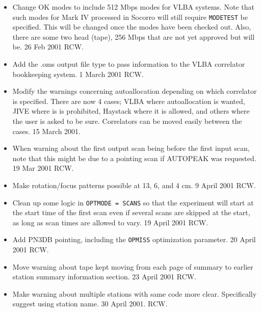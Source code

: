 \documentclass{report}
\begin{document}
\begin{itemize}


\item  Change OK modes to include 512 Mbps modes for VLBA systems.
       Note that such modes for Mark IV processed in Socorro will
       still require {\tt MODETEST} be specified.  This will be
       changed once the modes have been checked out.  Also, there
       are some two head (tape), 256 Mbps that are not yet approved
       but will be.  26 Feb 2001 RCW.

\item  Add the .oms output file type to pass information to the
       VLBA correlator bookkeeping system.   1 March 2001 RCW.

\item  Modify the warnings concerning autoallocation depending
       on which correlator is specified.  There are now 4 cases;
       VLBA where autoallocation is wanted, JIVE where is is
       prohibited, Haystack where it is allowed, and others where
       the user is asked to be sure.  Correlators can be moved
       easily between the cases.
       15 March 2001.

\item  When warning about the first output scan being before the
       first input scan, note that this might be due to a pointing
       scan if AUTOPEAK was requested.  19 Mar 2001  RCW.

\item  Make rotation/focus patterns possible at 13, 6, and 4 cm.
       9 April 2001 RCW.

\item  Clean up some logic in {\tt OPTMODE = SCANS} so that the
       experiment will start at the start time of the first scan
       even if several scans are skipped at the start, as long
       as scan times are allowed to vary.  19 April 2001  RCW.

\item  Add PN3DB pointing, including the {\tt OPMISS} optimization
       parameter.  20 April 2001  RCW.

\item  Move warning about tape kept moving from each page of summary
       to earlier station summary information section.  23 April 2001
       RCW.

\item  Make warning about multiple stations with same code more clear.
       Specifically suggest using station name.  30 April 2001. RCW.


\end{itemize}
\end{document}
